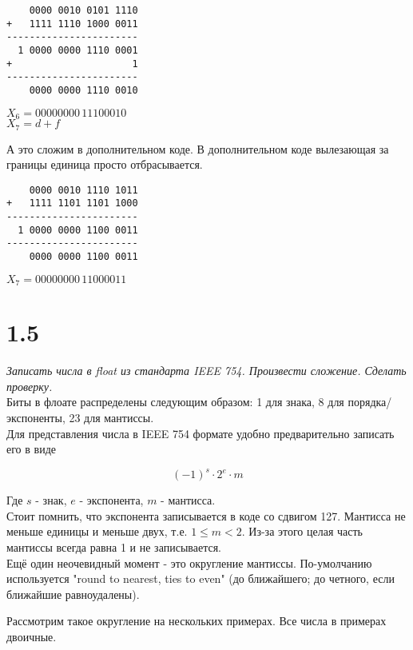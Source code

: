 \documentclass[a4paper,12pt]{article}
\begin{document}
\begin{verbatim}
    0000 0010 0101 1110
+   1111 1110 1000 0011
-----------------------
  1 0000 0000 1110 0001
+                     1
-----------------------
    0000 0000 1110 0010
\end{verbatim}

$X_6 = 0000 0000 \, 1110 0010$
\\

$X_7 = d + f$

А это сложим в дополнительном коде.
В дополнительном коде вылезающая за границы единица просто отбрасывается.

\begin{verbatim}
    0000 0010 1110 1011
+   1111 1101 1101 1000
-----------------------
  1 0000 0000 1100 0011
-----------------------
    0000 0000 1100 0011
\end{verbatim}

$X_7 = 0000 0000 \, 1100 0011$

\newpage




\section*{1.5}

\textit{Записать числа в float из стандарта IEEE 754. Произвести сложение. Сделать проверку.}
\\

Биты в флоате распределены следующим образом: 1 для знака, 8 для порядка/экспоненты, 23 для мантиссы.\
\\

Для представления числа в IEEE 754 формате удобно предварительно записать его в виде

\[(-1)^{s} \cdot 2^{e} \cdot m\]

Где $s$ - знак, $e$ - экспонента, $m$ - мантисса.
\\

Стоит помнить, что экспонента записывается в коде со сдвигом 127.
Мантисса не меньше единицы и меньше двух, т.е. $1 \leq m < 2$.
Из-за этого целая часть мантиссы всегда равна 1 и не записывается.
\\

Ещё один неочевидный момент - это округление мантиссы.
По-умолчанию используется "round to nearest, ties to even" (до ближайшего; до четного, если ближайшие равноудалены).

Рассмотрим такое округление на нескольких примерах.
Все числа в примерах двоичные.
\end{document}
